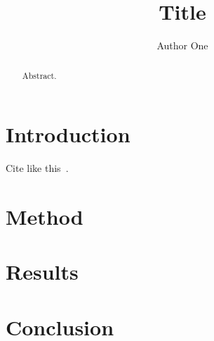 \documentclass[sigconf]{acmart}
\title{Title}
\author{Author One}
\affiliation{\institution{Institution}\country{Country}}
\begin{document}
\begin{abstract}
Abstract.
\end{abstract}
\maketitle
\section{Introduction}
Cite like this~\cite{example2026}.
\section{Method}
\section{Results}
\section{Conclusion}


\end{document}
